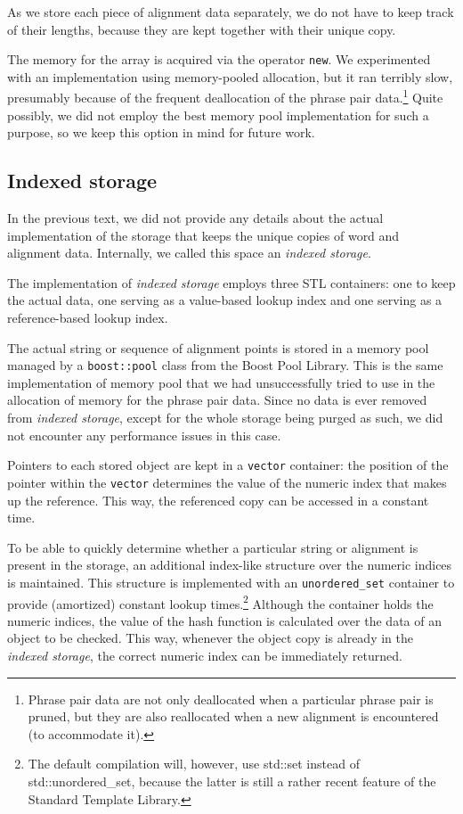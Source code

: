 As we store each piece of alignment data separately, we do not
have to keep track of their lengths, because they are kept together with their unique copy.

The memory for the array is acquired via the operator \texttt{new}.
We experimented with an implementation using memory-pooled allocation,
but it ran terribly slow, presumably because of the frequent deallocation
of the phrase pair data.\footnote{Phrase pair data are not only deallocated
when a particular phrase pair is pruned, but they are also reallocated when
a new alignment is encountered (to accommodate it).}
Quite possibly, we did not employ the best memory pool implementation for such
a purpose, so we keep this option in mind for future work.

\subsection{Indexed storage}

In the previous text, we did not provide any details about the actual implementation of
the storage that keeps the unique copies of word and alignment data.
Internally, we called this space an \emph{indexed storage}.

The implementation of \emph{indexed storage} employs three STL containers: one to keep
the actual data, one serving as a value-based lookup index and one serving as
a reference-based lookup index.

The actual string or sequence of alignment points is stored in a memory pool managed by
a \texttt{boost::pool} class from the Boost Pool Library.
This is the same implementation of memory pool that we had unsuccessfully tried to use
in the allocation of memory for the phrase pair data.
Since no data is ever removed from \emph{indexed storage}, except for the whole storage
being purged as such, we did not encounter any performance issues in this case.

Pointers to each stored object are kept in a \texttt{vector} container: the position of
the pointer within the \texttt{vector} determines the value of the numeric index that
makes up the reference. This way, the referenced copy can be accessed in a constant time.

To be able to quickly determine whether a particular string or alignment is present
in the storage, an additional index-like structure over the numeric indices is maintained.
This structure is implemented with an \texttt{unordered_set} container to provide
(amortized) constant lookup times.\footnote{The default \eppex{} compilation will, however,
use std::set instead of std::unordered_set, because the latter is still a rather recent
feature of the Standard Template Library.}
Although the container holds the numeric indices, the value of the hash function is calculated
over the data of an object to be checked. This way, whenever the object copy is already in
the \emph{indexed storage}, the correct numeric index can be immediately returned.

